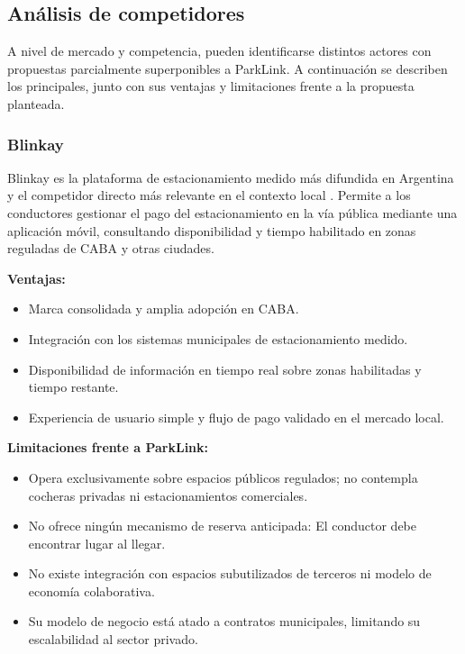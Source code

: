 \subsection{Análisis de competidores}

A nivel de mercado y competencia, pueden identificarse distintos actores con propuestas parcialmente superponibles a ParkLink. A continuación se describen los principales, junto con sus ventajas y limitaciones frente a la propuesta planteada.

\subsubsection{Blinkay}

Blinkay es la plataforma de estacionamiento medido más difundida en Argentina y el competidor directo más relevante en el contexto local \autocite{blinkay}. Permite a los conductores gestionar el pago del estacionamiento en la vía pública mediante una aplicación móvil, consultando disponibilidad y tiempo habilitado en zonas reguladas de CABA y otras ciudades.

\textbf{Ventajas:}
\begin{itemize}
    \item Marca consolidada y amplia adopción en CABA.
    \item Integración con los sistemas municipales de estacionamiento medido.
    \item Disponibilidad de información en tiempo real sobre zonas habilitadas y tiempo restante.
    \item Experiencia de usuario simple y flujo de pago validado en el mercado local.
\end{itemize}

\textbf{Limitaciones frente a ParkLink:}
\begin{itemize}
    \item Opera exclusivamente sobre espacios públicos regulados; no contempla cocheras privadas ni estacionamientos comerciales.
    \item No ofrece ningún mecanismo de reserva anticipada: El conductor debe encontrar lugar al llegar.
    \item No existe integración con espacios subutilizados de terceros ni modelo de economía colaborativa.
    \item Su modelo de negocio está atado a contratos municipales, limitando su escalabilidad al sector privado.
\end{itemize}

